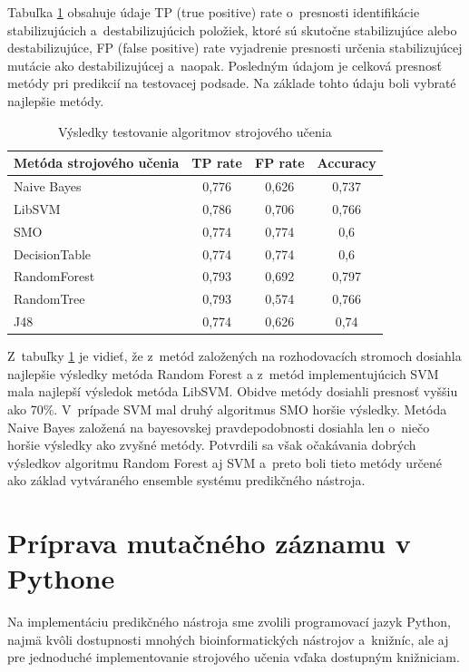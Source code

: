Tabuľka \ref{testovanie} obsahuje údaje TP (true positive) rate o~presnosti identifikácie stabilizujúcich a~destabilizujúcich položiek, ktoré sú skutočne stabilizujúce alebo destabilizujúce, FP (false positive) rate vyjadrenie presnosti určenia stabilizujúcej mutácie ako destabilizujúcej a~naopak. Posledným údajom je celková presnosť metódy pri predikcií na testovacej podsade. Na základe tohto údaju boli vybraté najlepšie metódy.

\begin{table}[H]
	\centering
	\begin{tabular}{ | l | c | c | c| }
		\hline 
		Metóda strojového učenia & TP rate & FP rate & Accuracy \\ \hline
		Naive Bayes & 0,776 & 0,626 & 0,737 \\ \hline
		LibSVM &  0,786   & 0,706   & 0,766  \\ \hline
		SMO & 0,774 & 0,774 & 0,6\\ \hline
		DecisionTable & 0,774 & 0,774 & 0,6\\ \hline
		RandomForest & 0,793 & 0,692 & 0,797\\ \hline
		RandomTree & 0,793 & 0,574 & 0,766\\ \hline
		J48 & 0,774 & 0,626 & 0,74\\ \hline		
	\end{tabular}
	\caption {Výsledky testovanie algoritmov strojového učenia} \label{testovanie} 
\end{table}

Z~tabuľky \ref{testovanie} je vidieť, že z~metód založených na rozhodovacích stromoch dosiahla najlepšie výsledky metóda Random Forest a z~metód implementujúcich SVM mala najlepší výsledok metóda LibSVM. Obidve metódy dosiahli presnosť vyššiu ako 70\%. V~prípade SVM mal druhý algoritmus SMO horšie výsledky. Metóda Naive Bayes založená na bayesovskej pravdepodobnosti dosiahla len o~niečo horšie výsledky ako zvyšné metódy. Potvrdili sa však očakávania dobrých výsledkov algoritmu Random Forest aj SVM a~preto boli tieto metódy určené ako základ vytváraného ensemble systému predikčného nástroja.

\section{Príprava mutačného záznamu v Pythone}

Na implementáciu predikčného nástroja sme zvolili programovací jazyk Python, najmä kvôli dostupnosti mnohých bioinformatických nástrojov a~knižníc, ale aj pre jednoduché implementovanie strojového učenia vďaka dostupným knižniciam.

